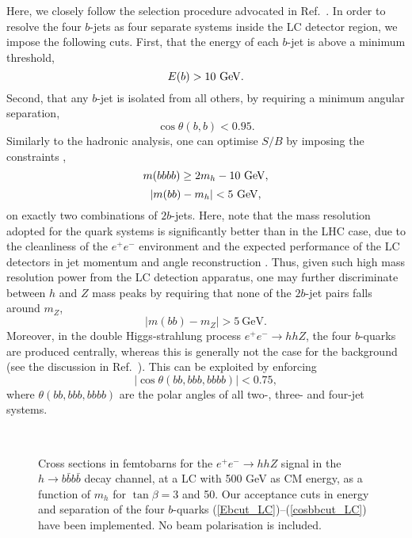 Here, we closely follow the selection procedure advocated in
Ref.~\cite{noi}.  In order to resolve the four $b$-jets as four
separate systems inside the LC detector region, we impose the
following cuts. First, that the energy of each $b$-jet is above a
minimum threshold,
\begin{equation}\label{Ebcut_LC}
E(b)>10~{\rm{GeV}}.
\end{equation}
Second, that any $b$-jet is isolated from all others, by
requiring a minimum angular separation,
\begin{equation}\label{cosbbcut_LC}
\cos\theta({b,b})<0.95.
\end{equation}
Similarly to the hadronic analysis, one can optimise 
$S/B$ by imposing the constraints
\cite{noi},
\begin{equation}\label{Mbbbbcut_LC}
m({bbbb})\ge 2m_h-10~{\rm{GeV}},
\end{equation}
\begin{equation}\label{Mbbcut_LC}
|m({bb})-m_h|<5~{\rm{GeV}},
\end{equation}
on exactly two combinations of  $2b$-jets.  Here, note that the mass
resolution adopted for the quark systems is significantly better
than in the LHC case, due to the cleanliness of the $e^+e^-$
environment and the expected performance of the LC detectors in jet
momentum and angle reconstruction \cite{resolution}.  Thus, given such
high mass resolution power from the LC detection apparatus, one may
further discriminate between $h$ and $Z$ mass peaks by requiring that
none of the $2b$-jet pairs falls around $m_Z$,
\begin{equation}\label{MZcut_LC}
|m({bb})-m_Z|>5~{\mathrm{GeV}}.
\end{equation}
Moreover, in the double Higgs-strahlung process $e^+e^-\to hhZ$,
the four $b$-quarks are produced centrally,
whereas this is generally not the case for the background (see
the discussion in Ref.~\cite{noi}). This can be exploited by enforcing
\begin{equation}\label{cosbbbbcut_LC}
|\cos\theta({bb,bbb,bbbb})|<0.75,
\end{equation}
where $\theta({bb,bbb,bbbb})$ are the polar angles of all 
two-, three- and four-jet systems.
\begin{figure}[!ht]
~\hskip2.5cm
\caption{Cross sections in femtobarns for the $e^+e^-\to hhZ$ signal
in the $h\to b\bar b b\bar b$ decay channel,
at a LC with 500 GeV as CM energy, as a function of $m_h$
for $\tan\beta=3$ and 50.
Our acceptance cuts in energy and separation of the four $b$-quarks
(\ref{Ebcut_LC})--(\ref{cosbbcut_LC}) have been implemented.
No beam polarisation is included.}
\label{fig:signal_LC}
\end{figure}

